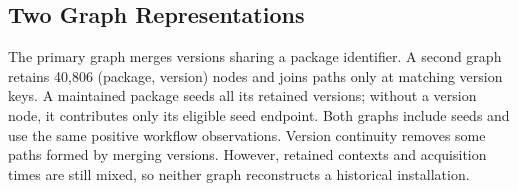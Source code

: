 \subsection{Two Graph Representations}
The primary graph merges versions sharing a package identifier. A second graph retains 40,806 (package, version) nodes and joins paths only at matching version keys. A maintained package seeds all its retained versions; without a version node, it contributes only its eligible seed endpoint. Both graphs include seeds and use the same positive workflow observations. Version continuity removes some paths formed by merging versions. However, retained contexts and acquisition times are still mixed, so neither graph reconstructs a historical installation.
